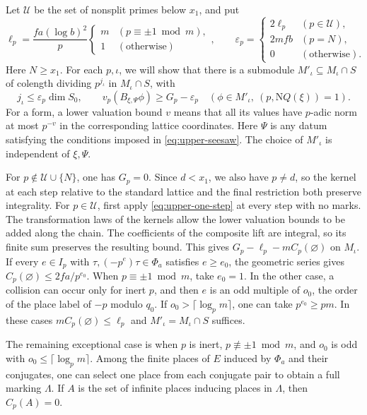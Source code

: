 Let \(\mathcal U\) be the set of nonsplit primes below \(x_1\), and put
\[
 \ell_p=\frac{fa(\log b)^2}{p}
      \begin{cases} m & (p\equiv\pm1\bmod m),\\1 & (\text{otherwise}) \end{cases},
 \qquad
 \varepsilon_p=
      \begin{cases}
       2\ell_p &(p\in\mathcal U),\\
       2mfb &(p=N),\\
       0 &(\text{otherwise}).
      \end{cases}
\]
Here \(N\ge x_1\). For each \(p,\iota\), we will show that there is a
submodule \(M'_\iota\subseteq M_\iota\cap S\) of colength dividing
\(p^{j_\iota}\) in \(M_\iota\cap S\), with
\begin{equation}\label{eq:upper-local}
 j_\iota\le\varepsilon_p\dim S_0,\qquad
 v_p(B_{\xi,\Psi}\phi)\ge G_p-\varepsilon_p
  \quad(\phi\in M'_\iota,\ (p,\mathrm NQ(\xi))=1).
\end{equation}
For a form, a lower valuation bound \(v\) means that all its values have
\(p\)-adic norm at most \(p^{-v}\) in the corresponding lattice coordinates.
Here \(\Psi\) is any datum satisfying the conditions imposed in
\eqref{eq:upper-seesaw}. The choice of \(M'_\iota\) is independent of
\(\xi,\Psi\).

For \(p\notin\mathcal U\cup\{N\}\), one has \(G_p=0\).
Since \(d<x_1\), we also have \(p\ne d\), so the kernel at each step
relative to the standard lattice and the final restriction both preserve
integrality.
For \(p\in\mathcal U\), first apply \eqref{eq:upper-one-step} at every
step with no marks. The transformation laws of the kernels allow the
lower valuation bounds to be added along the chain. The coefficients
of the composite lift are integral, so its finite sum preserves the
resulting bound. This gives \(G_p-\ell_p-mC_p(\varnothing)\) on \(M_\iota\).
If every \(e\in I_p\) with \(\tau,(-p^e)\tau\in\Phi_a\) satisfies \(e\ge e_0\),
the geometric series gives \(C_p(\varnothing)\le 2fa/p^{e_0}\).
When \(p\equiv\pm1\bmod m\), take \(e_0=1\).
In the other case, a collision can occur only for inert \(p\), and then
\(e\) is an odd multiple of \(o_0\), the order of the place label of
\(-p\) modulo \(q_0\). If \(o_0>\lceil\log_p m\rceil\), one can take
\(p^{e_0}\ge pm\). In these cases \(mC_p(\varnothing)\le\ell_p\)
and \(M'_\iota=M_\iota\cap S\) suffices.

The remaining exceptional case is when \(p\) is inert,
\(p\not\equiv\pm1\bmod m\), and \(o_0\) is odd with
\(o_0\le\lceil\log_p m\rceil\).
Among the finite places of \(E\) induced by \(\Phi_a\) and their conjugates,
one can select one place from each conjugate pair to obtain a full
marking \(\Lambda\). If \(A\) is the set of infinite places inducing
places in \(\Lambda\), then \(C_p(A)=0\).

